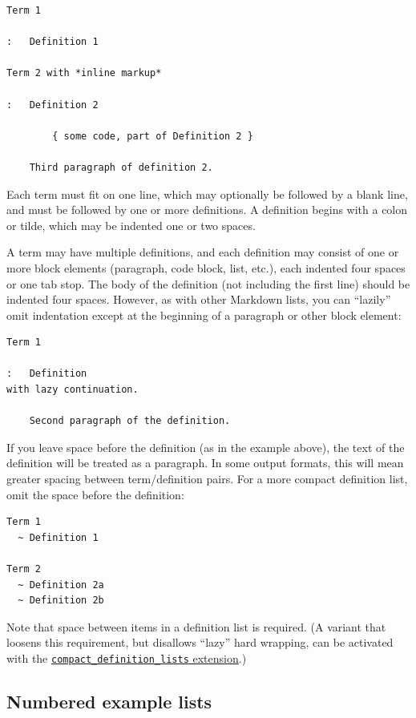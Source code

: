 \documentclass[
  b5paper
]{book}
\begin{document}
\begin{verbatim}
Term 1

:   Definition 1

Term 2 with *inline markup*

:   Definition 2

        { some code, part of Definition 2 }

    Third paragraph of definition 2.
\end{verbatim}

Each term must fit on one line, which may optionally be followed by a
blank line, and must be followed by one or more definitions. A
definition begins with a colon or tilde, which may be indented one or
two spaces.

A term may have multiple definitions, and each definition may consist of
one or more block elements (paragraph, code block, list, etc.), each
indented four spaces or one tab stop. The body of the definition (not
including the first line) should be indented four spaces. However, as
with other Markdown lists, you can ``lazily'' omit indentation except at
the beginning of a paragraph or other block element:

\begin{verbatim}
Term 1

:   Definition
with lazy continuation.

    Second paragraph of the definition.
\end{verbatim}

If you leave space before the definition (as in the example above), the
text of the definition will be treated as a paragraph. In some output
formats, this will mean greater spacing between term/definition pairs.
For a more compact definition list, omit the space before the
definition:

\begin{verbatim}
Term 1
  ~ Definition 1

Term 2
  ~ Definition 2a
  ~ Definition 2b
\end{verbatim}

Note that space between items in a definition list is required. (A
variant that loosens this requirement, but disallows ``lazy'' hard
wrapping, can be activated with the
\hyperref[extension-compact_definition_lists]{\texttt{compact\_definition\_lists}
extension}.)

\subsection{Numbered example lists}\label{numbered-example-lists}
\end{document}
